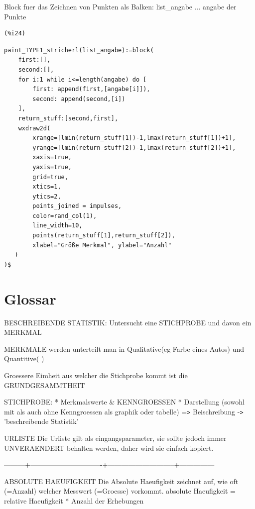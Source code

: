 \documentclass{article}
\begin{document}
Block fuer das Zeichnen von Punkten als Balken:
    list\_angabe ... angabe der Punkte

\noindent
\begin{minipage}[t]{8ex}{\color{red}\bf
\begin{verbatim}
(%i24) 
\end{verbatim}}
\end{minipage}
\begin{minipage}[t]{\textwidth}{\color{blue}
\begin{verbatim}
paint_TYPE1_stricherl(list_angabe):=block(
    first:[],
    second:[],
    for i:1 while i<=length(angabe) do [
        first: append(first,[angabe[i]]),
        second: append(second,[i])
    ],
    return_stuff:[second,first],
    wxdraw2d(
        xrange=[lmin(return_stuff[1])-1,lmax(return_stuff[1])+1], 
        yrange=[lmin(return_stuff[2])-1,lmax(return_stuff[2])+1], 
        xaxis=true, 
        yaxis=true, 
        grid=true, 
        xtics=1, 
        ytics=2,
        points_joined = impulses,
        color=rand_col(1),
        line_width=10,
        points(return_stuff[1],return_stuff[2]),
        xlabel="Größe Merkmal", ylabel="Anzahl"
   )
)$
\end{verbatim}}
\end{minipage}


\section{Glossar}


BESCHREIBENDE STATISTIK:
    Untersucht eine STICHPROBE und davon ein MERKMAL

MERKMALE werden unterteilt man in Qualitative(eg Farbe eines Autos) und Quantitive( )

Groessere Eimheit aus welcher die Stichprobe kommt ist die GRUNDGESAMMTHEIT

STICHPROBE: 
    * Merkmalswerte \& KENNGROESSEN
    * Darstellung (sowohl mit als auch ohne Kenngroessen als graphik oder tabelle) 
       =\verb|>| Beischreibung -\verb|>| 'beschreibende Statistik'

URLISTE      
   Die Urliste gilt als eingangsparameter, sie sollte jedoch immer UNVERAENDERT behalten werden, daher wird sie einfach kopiert.

---------+-------------------------------+-----------------------------+---------------

ABSOLUTE HAEUFIGKEIT
    Die Absolute Haeufigkeit zeichnet auf, wie oft (=Anzahl) welcher Messwert (=Groesse) vorkommt. 
        absolute Haeufigkeit = relative Haeufigkeit * Anzahl der Erhebungen
\end{document}
